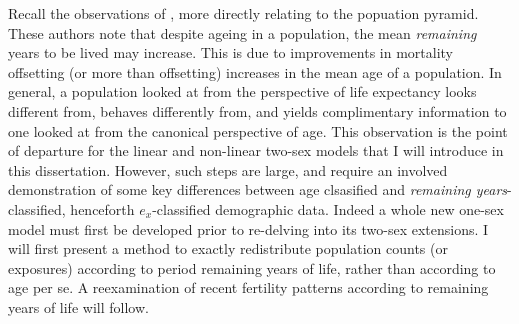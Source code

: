 Recall the observations of \citet{sanderson2005average}, more directly
relating to the popuation pyramid. These authors note that despite ageing in a
population, the mean \textit{remaining} years to be lived may increase. This is due 
to improvements in mortality offsetting (or more than offsetting) increases in
the mean age of a population. In general, a population looked at from the
perspective of life expectancy looks different from, behaves differently from,
and yields complimentary information to one looked at from the canonical
perspective of age. This observation is the point of departure for the
linear and non-linear two-sex models that I will introduce in this dissertation.
However, such steps are large, and require an involved demonstration of some
key differences between age clsasified and \textit{remaining years}-classified,
henceforth $e_x$-classified demographic data. Indeed a whole new one-sex
model must first be developed prior to re-delving into its two-sex extensions. 
I will first present a method
to exactly redistribute population counts (or exposures) according to period 
remaining years of life, rather than according to age per se. A reexamination 
of recent fertility patterns according to remaining years of life will follow.
